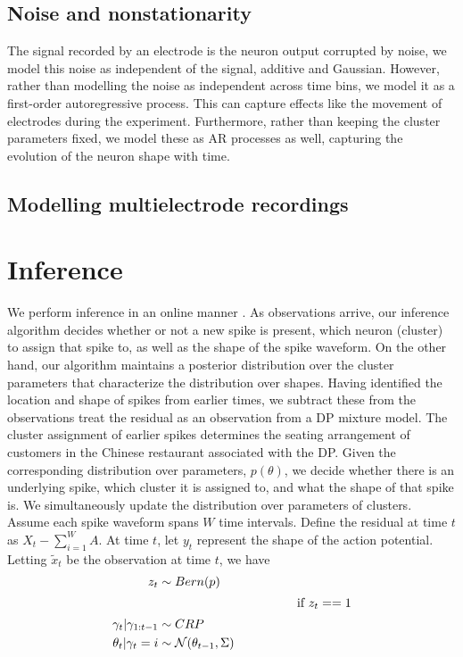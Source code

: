 \subsection{Noise and nonstationarity}
The signal recorded by an electrode is the neuron output corrupted by noise, we model this noise as independent of the signal, additive and Gaussian.
However, rather than modelling the noise as independent across time bins, we model it as a first-order autoregressive process. This can capture
effects like the movement of electrodes during the experiment. Furthermore, rather than keeping the cluster parameters fixed, we model these as
AR processes as well, capturing the evolution of the neuron shape with time.

\subsection{Modelling multielectrode recordings}

\section{Inference}
We perform inference in an online manner \cite{WangDun2009}. As observations arrive, our inference algorithm decides whether or not a 
new spike is present, which neuron (cluster) to assign that spike to, as well as the shape of the spike waveform. On the other hand, our algorithm 
maintains a posterior distribution over the cluster parameters that characterize the distribution over shapes. Having identified the location and shape of 
spikes from earlier times, we subtract these from the observations treat the residual as an observation from a DP mixture model.
The cluster assignment of earlier spikes determines the seating arrangement of customers in the Chinese restaurant associated with the DP. Given the
corresponding distribution over parameters, $p(\theta)$, we decide whether there is an underlying spike, which cluster it is assigned to, and what
the shape of that spike is. We simultaneously update the distribution over parameters of clusters. Assume each spike waveform spans $W$ time intervals. 
Define the residual at time $t$ as $X_t - \sum_{i=1}^W A$. At time $t$, let $y_t$ represent the shape of the action potential.
Letting $\tilde{x}_t$ be the observation at time $t$, we have
\begin{align}
  z_t  & \sim Bern(p) \\
  \intertext{\hspace{2in} if $z_t == 1$}
  \gamma_t| \gamma_{1:t-1} &\sim CRP \\
  \theta_t| \gamma_t = i & \sim \mathcal{N}(\theta_{t-1},\Sigma)
\end{align}
